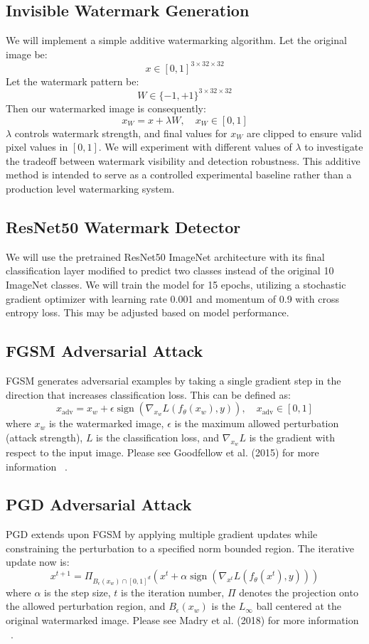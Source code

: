 \documentclass[sigconf, nonacm]{acmart}
\begin{document}
\subsection{Invisible Watermark Generation}
We will implement a simple additive watermarking algorithm.
Let the original image be:
\[
    x \in [0,1]^{3 \times 32 \times 32}
\]
Let the watermark pattern be:
\[
    W \in \{-1, +1\}^{3 \times 32 \times 32}
\]
Then our watermarked image is consequently:
\[
    x_W = x + \lambda W, \quad x_W \in [0, 1]
\]
$\lambda$ controls watermark strength, and final values for $x_W$ are clipped to ensure valid pixel values in $[0, 1]$. We will experiment with different values of $\lambda$ to investigate the tradeoff between watermark visibility and detection robustness. This additive method is intended to serve as a controlled experimental baseline rather than a production level watermarking system.

\subsection{ResNet50 Watermark Detector}
We will use the pretrained ResNet50 ImageNet architecture with its final classification layer modified to predict two classes instead of the original 10 ImageNet classes. We will train the model for 15 epochs, utilizing a stochastic gradient optimizer with learning rate 0.001 and momentum of 0.9 with cross entropy loss. This may be adjusted based on model performance.

\subsection{FGSM Adversarial Attack}
FGSM generates adversarial examples by taking a single gradient step in the direction that increases classification loss. This can be defined as:
\[
    x_{\mathrm{adv}} = x_w + \epsilon \operatorname{sign}(\nabla_{x_w}L(f_\theta(x_w),y)), \quad x_{\mathrm{adv}} \in [0, 1]
\]
where $x_w$ is the watermarked image, $\epsilon$ is the maximum allowed perturbation (attack strength), $L$ is the classification loss, and $\nabla_{x_w}L$ is the gradient with respect to the input image. Please see Goodfellow et al. (2015) for more information ~\cite{paper2}.

\subsection{PGD Adversarial Attack}
PGD extends upon FGSM by applying multiple gradient updates while constraining the perturbation to a specified norm bounded region. The iterative update now is:
\[
    x^{t + 1} = \Pi_{B_\epsilon(x_w)\cap[0, 1]^d}\left(x^t + \alpha\operatorname{sign}\left(\nabla_{x^t}L(f_\theta(x^t),y)\right)\right)
\]
where $\alpha$ is the step size, $t$ is the iteration number, $\Pi$ denotes the projection onto the allowed perturbation region, and $B_\epsilon(x_w)$ is the $L_\infty$ ball centered at the original watermarked image. Please see Madry et al. (2018) for more information ~\cite{paper3}.
\end{document}
